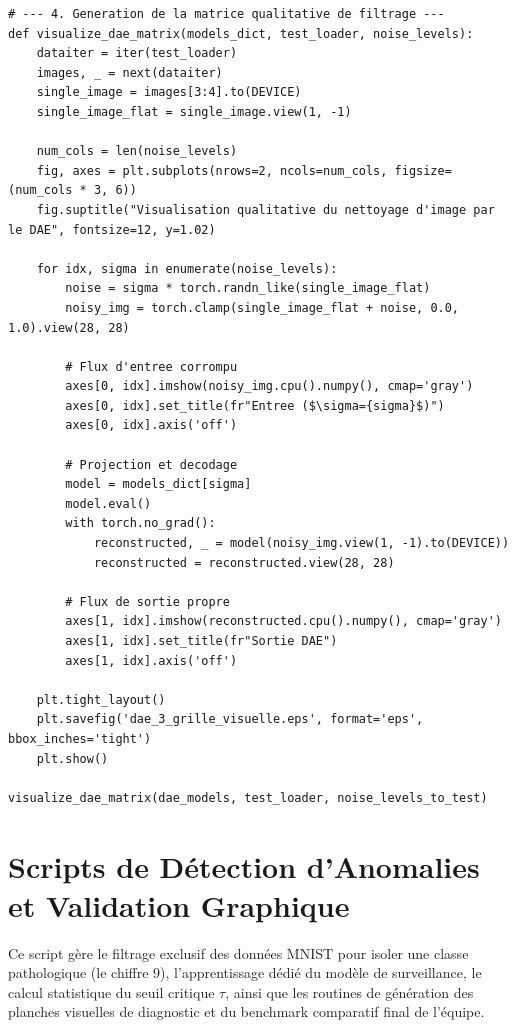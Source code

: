 \documentclass[11pt,a4paper]{report}
\begin{document}
\begin{lstlisting}[caption=Pipeline d'exploration et d'analyse de robustesse du DAE]
# --- 4. Generation de la matrice qualitative de filtrage ---
def visualize_dae_matrix(models_dict, test_loader, noise_levels):
    dataiter = iter(test_loader)
    images, _ = next(dataiter)
    single_image = images[3:4].to(DEVICE)
    single_image_flat = single_image.view(1, -1)
    
    num_cols = len(noise_levels)
    fig, axes = plt.subplots(nrows=2, ncols=num_cols, figsize=(num_cols * 3, 6))
    fig.suptitle("Visualisation qualitative du nettoyage d'image par le DAE", fontsize=12, y=1.02)
    
    for idx, sigma in enumerate(noise_levels):
        noise = sigma * torch.randn_like(single_image_flat)
        noisy_img = torch.clamp(single_image_flat + noise, 0.0, 1.0).view(28, 28)
        
        # Flux d'entree corrompu
        axes[0, idx].imshow(noisy_img.cpu().numpy(), cmap='gray')
        axes[0, idx].set_title(fr"Entree ($\sigma={sigma}$)")
        axes[0, idx].axis('off')
        
        # Projection et decodage
        model = models_dict[sigma]
        model.eval()
        with torch.no_grad():
            reconstructed, _ = model(noisy_img.view(1, -1).to(DEVICE))
            reconstructed = reconstructed.view(28, 28)
            
        # Flux de sortie propre
        axes[1, idx].imshow(reconstructed.cpu().numpy(), cmap='gray')
        axes[1, idx].set_title(fr"Sortie DAE")
        axes[1, idx].axis('off')
        
    plt.tight_layout()
    plt.savefig('dae_3_grille_visuelle.eps', format='eps', bbox_inches='tight')
    plt.show()

visualize_dae_matrix(dae_models, test_loader, noise_levels_to_test)
\end{lstlisting}

	\chapter{Scripts de Détection d'Anomalies et Validation Graphique}
	
	Ce script gère le filtrage exclusif des données MNIST pour isoler une classe pathologique (le chiffre 9), l'apprentissage dédié du modèle de surveillance, le calcul statistique du seuil critique $\tau$, ainsi que les routines de génération des planches visuelles de diagnostic et du benchmark comparatif final de l'équipe.
	
\end{document}
